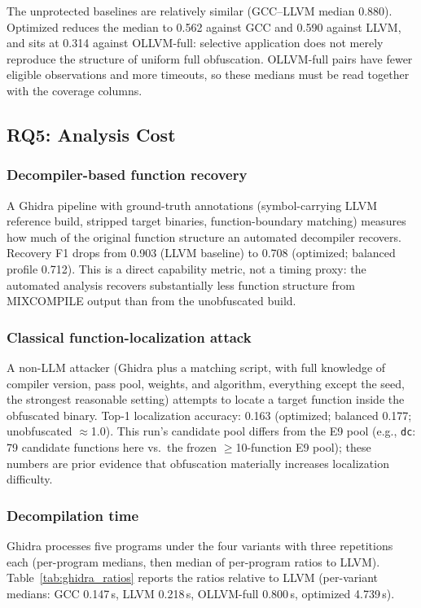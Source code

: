 \documentclass[pdflatex,sn-mathphys-num]{sn-jnl}
\theoremstyle{thmstyleone}%
\theoremstyle{thmstyletwo}%
\theoremstyle{thmstylethree}%
\begin{document}
The unprotected baselines are relatively similar (GCC--LLVM median 0.880). Optimized
reduces the median to 0.562 against GCC and 0.590 against LLVM, and sits at 0.314
against OLLVM-full: selective application does not merely reproduce the structure of
uniform full obfuscation. OLLVM-full pairs have fewer eligible observations and more
timeouts, so these medians must be read together with the coverage columns.

\subsection{RQ5: Analysis Cost}

\subsubsection{Decompiler-based function recovery}
A Ghidra pipeline with ground-truth annotations (symbol-carrying LLVM reference build,
stripped target binaries, function-boundary matching) measures how much of the
original function structure an automated decompiler recovers. Recovery F1 drops from
0.903 (LLVM baseline) to 0.708 (optimized; balanced profile 0.712). This is a direct
capability metric, not a timing proxy: the automated analysis recovers substantially
less function structure from MIXCOMPILE output than from the unobfuscated build.

\subsubsection{Classical function-localization attack}
A non-LLM attacker (Ghidra plus a matching script, with full knowledge of compiler
version, pass pool, weights, and algorithm, everything except the seed, the strongest
reasonable setting) attempts to locate a target function inside the obfuscated binary.
Top-1 localization accuracy: 0.163 (optimized; balanced 0.177; unobfuscated
$\approx$1.0). This run's candidate pool differs from the E9 pool (e.g.,
\texttt{dc}: 79 candidate functions here vs.\ the frozen $\geq$10-function E9 pool);
these numbers are prior evidence that obfuscation materially increases localization
difficulty.

\subsubsection{Decompilation time}
Ghidra processes five programs under the four variants with three repetitions each
(per-program medians, then median of per-program ratios to LLVM).
Table~\ref{tab:ghidra_ratios} reports the ratios relative to LLVM (per-variant
medians: GCC 0.147\,s, LLVM 0.218\,s, OLLVM-full 0.800\,s, optimized 4.739\,s).
\end{document}
